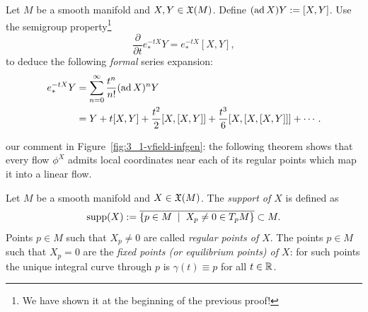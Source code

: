 \begin{exercise}
	Let $M$ be a smooth manifold and $X,Y\in\mathfrak{X}(M)$.
	Define $(\operatorname{ad} X) Y := [X,Y]$.
	Use the semigroup property\footnote{We have shown it at the beginning of the previous proof!}
	\begin{equation}
		\frac{\partial}{\partial t} e_*^{-tX} Y = e_*^{-tX}[X,Y],
	\end{equation}
	to deduce the following \emph{formal} series expansion:
	\begin{align}
		e_*^{-tX} Y
		 & = \sum_{n=0}^\infty \frac{t^n}{n!}(\operatorname{ad} X)^n Y                                   \\
		 & = Y + t[X,Y] + \frac{t^2}{2}[X, [X, Y]] + \frac{t^3}{6} [X,[X,[X,Y]]] + \cdots.
	\end{align}
\end{exercise}

 our comment in Figure~\ref{fig:3_1-vfield-infgen}: the following theorem shows that every flow $\phi^X$ admits local coordinates near each of its regular points which map it into a linear flow.

\begin{definition}
	Let $M$ be a smooth manifold and $X\in\mathfrak{X}(M)$.
	The \emph{support of $X$} is defined as
	\begin{equation}
		\operatorname{supp}(X):=\overline{\left\lbrace p\in M \;\mid\; X_p\neq 0 \in T_p M\right\rbrace}\subset M.
	\end{equation}
	Points $p\in M$ such that $X_p\neq 0$ are called \emph{regular points of $X$}.
	The points $p\in M$ such that $X_p = 0$ are the \emph{fixed points (or equilibrium points) of $X$}: for such points the unique integral curve through $p$ is $\gamma(t) \equiv p$ for all $t\in\mathbb{R}$.
\end{definition}

